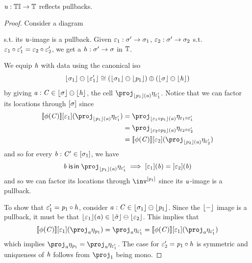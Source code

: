 \begin{lemma}\label{lem:tinstU-pls-refl}
    $\mathit{u} : {\mathbb{T}\mathbb{I}} \to \mathbb{T}$ reflects pullbacks.
\end{lemma}
\begin{proof}
    Consider a diagram 
    s.t. its $\mathit{u}$-image is a pullback.
    Given $\varepsilon_1 : \sigma' \to \sigma_1$, $\varepsilon_2 : \sigma' \to \sigma_2$ s.t. $\varepsilon_1 \circ \varepsilon_1' = \varepsilon_2 \circ \varepsilon_2'$,
    we get a $\mathit{h} : \sigma' \to \sigma$ in $\mathbb{T}$.

    We equip $\mathit{h}$ with data using the canonical iso
    \[ \lfloor\sigma_1\rfloor \ominus \lfloor\varepsilon_1'\rfloor \cong (\lfloor\sigma_1\rfloor \ominus \lfloor\mathit{p}_1\rfloor) \oplus (\lfloor\sigma\rfloor \ominus \lfloor\mathit{h}\rfloor) \]
    by giving $\mathit{a} : \mathit{C} \in \lfloor\sigma\rfloor \ominus \lfloor\mathit{h}\rfloor$, the cell $\proj_{\concL{\vp_1}(\va)} \mvarM_{\me_1'}$.
    Notice that we can factor its locations through $[\sigma]$ since
    \begin{align*}
        \sem{\phi(\vC)}\anyL{\me_1}(\proj_{\concL{\vp_1}(\va)} \mvarM_{\me_1'}) & = 
        \proj_{\concL{\me_1 \comp \vp_1}(\va)} \mvarM_{\me_1 \comp \me_1'} \\
         & = \proj_{\concL{\me_2 \comp \vp_2}(\va)} \mvarM_{\me_2 \comp \me_2'} \\
         & = \sem{\phi(\vC)}\anyL{\me_2}(\proj_{\concL{\vp_2}(\va)} \mvarM_{\me_2'})
    \end{align*}
    and so for every $\mathit{b} : \mathit{C}' \in [\sigma_1]$, we have 
    \[ \vb \isIn \proj_{\concL{\vp_1}(\va)} \mvarM_{\me_1'} \implies \anyL{\me_1}(\vb) = \anyL{\me_2}(\vb) \]
    and so we can factor its locations through $\inv^{\anyL{\vp_1}}$ since its $\mathit{u}$-image is a pullback. 

    To show that $\varepsilon_1' = \mathit{p}_1 \circ \mathit{h}$, consider $\mathit{a} : \mathit{C} \in \lfloor\sigma_1\rfloor \ominus \lfloor\mathit{p}_1\rfloor$.
    Since the $\lfloor-\rfloor$ image is a pullback, it must be that $\lfloor\varepsilon_1\rfloor(\mathit{a}) \in \lfloor\hat\sigma\rfloor \ominus \lfloor\varepsilon_2\rfloor$.
    This implies that 
        \[ \sem{\phi(\vC)}\anyL{\me_1}(\proj_\va \mvarM_{\vp_1}) = \proj_\va \mvarM_{\me_1'}
                                                                 = \sem{\phi(\vC)}\anyL{\me_1}(\proj_\va \mvarM_{\me_1'}) \] 
    which implies $\proj_\va \mvarM_{\vp_1} = \proj_\va \mvarM_{\me_1'}$.
    The case for $\varepsilon_2' = \mathit{p}_1 \circ \mathit{h}$ is symmetric and uniqueness of $\mathit{h}$ follows from $\proj_1$ being mono.
\end{proof}

